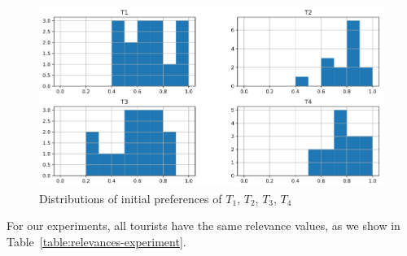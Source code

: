 \begin{figure}[h]
\vspace{-0.2cm}
    \centering
    \includegraphics[scale=0.24]{tourist_histogram.png}
    \vspace{-0.3cm}
    \caption{Distributions of initial preferences of $T_1$, $T_2$, $T_3$, $T_4$}
    \label{fig:tourist_hist}
    \vspace{-0.3cm}
\end{figure}

For our experiments, all tourists have the same relevance values, as we show in 
Table~\ref{table:relevances-experiment}.

